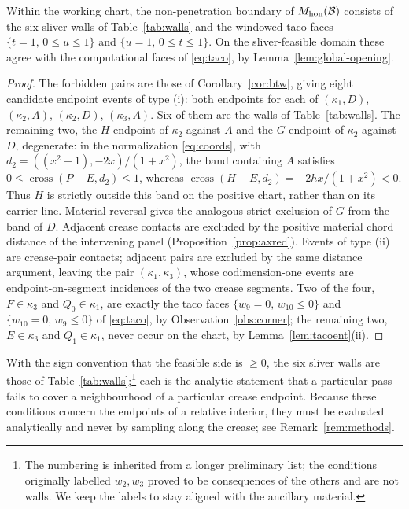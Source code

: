 \begin{corollary}\label{cor:wallcomplete}
Within the working chart, the non-penetration boundary of $M_{\mathrm{hon}}(\mathcal{B})$ consists of the six sliver walls of Table~\ref{tab:walls} and the windowed taco faces $\{t=1,\,0\le u\le1\}$ and $\{u=1,\,0\le t\le1\}$. On the sliver-feasible domain these agree with the computational faces of \eqref{eq:taco}, by Lemma~\ref{lem:global-opening}.
\end{corollary}

\begin{proof}
The forbidden pairs are those of Corollary~\ref{cor:btw}, giving eight candidate endpoint events of type \textup{(i)}: both endpoints for each of $(\kappa_1,D)$, $(\kappa_2,A)$, $(\kappa_2,D)$, $(\kappa_3,A)$. Six of them are the walls of Table~\ref{tab:walls}. The remaining two, the $H$-endpoint of $\kappa_2$ against $A$ and the $G$-endpoint of $\kappa_2$ against $D$, degenerate: in the normalization \eqref{eq:coords}, with $d_2=((x^2-1),-2x)/(1+x^2)$, the band containing $A$ satisfies $0\le\operatorname{cross}(P-E,d_2)\le1$, whereas $\operatorname{cross}(H-E,d_2)=-2hx/(1+x^2)<0$. Thus $H$ is strictly outside this band on the positive chart, rather than on its carrier line. Material reversal gives the analogous strict exclusion of $G$ from the band of $D$. Adjacent crease contacts are excluded by the positive material chord distance of the intervening panel (Proposition~\ref{prop:axred}). Events of type \textup{(ii)} are crease-pair contacts; adjacent pairs are excluded by the same distance argument, leaving the pair $(\kappa_1,\kappa_3)$, whose codimension-one events are endpoint-on-segment incidences of the two crease segments. Two of the four, $F\in\kappa_3$ and $Q_0\in\kappa_1$, are exactly the taco faces $\{w_9=0,\,w_{10}\le0\}$ and $\{w_{10}=0,\,w_9\le0\}$ of \eqref{eq:taco}, by Observation~\ref{obs:corner}; the remaining two, $E\in\kappa_3$ and $Q_1\in\kappa_1$, never occur on the chart, by Lemma~\ref{lem:tacoent}(ii).
\end{proof}

With the sign convention that the feasible side is $\ge0$, the six sliver walls are those of Table~\ref{tab:walls};\footnote{The numbering is inherited from a longer preliminary list; the conditions originally labelled $w_2,w_3$ proved to be consequences of the others and are not walls. We keep the labels to stay aligned with the ancillary material.} each is the analytic statement that a particular pass fails to cover a neighbourhood of a particular crease endpoint. Because these conditions concern the endpoints of a relative interior, they must be evaluated analytically and never by sampling along the crease; see Remark~\ref{rem:methods}.

